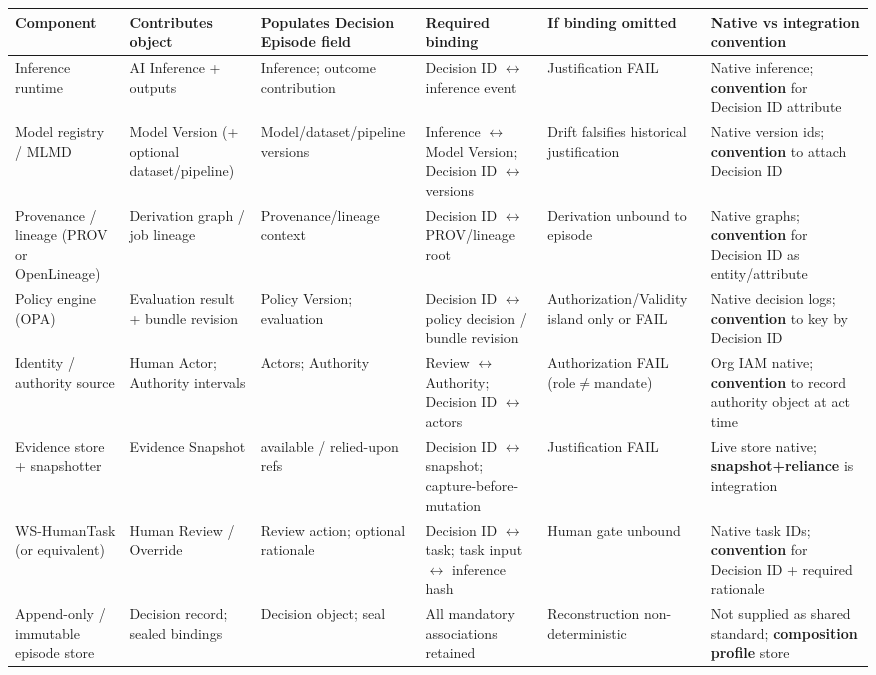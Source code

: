 \documentclass[11pt,a4paper]{article}
\begin{document}
\begin{table}[t]
\centering
\small
\begin{tabularx}{\textwidth}{|X|X|X|X|X|X|}
\hline
 Component & Contributes object & Populates Decision Episode field & Required binding & If binding omitted & Native vs integration convention \\
 \hline
 \hline
 Inference runtime & AI Inference + outputs & Inference; outcome contribution & Decision ID $\leftrightarrow$ inference event & Justification FAIL & Native inference; \textbf{convention} for Decision ID attribute \\
 \hline
 Model registry / MLMD & Model Version (+ optional dataset/pipeline) & Model/dataset/pipeline versions & Inference $\leftrightarrow$ Model Version; Decision ID $\leftrightarrow$ versions & Drift falsifies historical justification & Native version ids; \textbf{convention} to attach Decision ID \\
 \hline
 Provenance / lineage (PROV or OpenLineage) & Derivation graph / job lineage & Provenance/lineage context & Decision ID $\leftrightarrow$ PROV/lineage root & Derivation unbound to episode & Native graphs; \textbf{convention} for Decision ID as entity/attribute \\
 \hline
 Policy engine (OPA) & Evaluation result + bundle revision & Policy Version; evaluation & Decision ID $\leftrightarrow$ policy decision / bundle revision & Authorization/Validity island only or FAIL & Native decision logs; \textbf{convention} to key by Decision ID \\
 \hline
 Identity / authority source & Human Actor; Authority intervals & Actors; Authority & Review $\leftrightarrow$ Authority; Decision ID $\leftrightarrow$ actors & Authorization FAIL (role$\neq$mandate) & Org IAM native; \textbf{convention} to record authority object at act time \\
 \hline
 Evidence store + snapshotter & Evidence Snapshot & available / relied-upon refs & Decision ID $\leftrightarrow$ snapshot; capture-before-mutation & Justification FAIL & Live store native; \textbf{snapshot+reliance} is integration \\
 \hline
 WS-HumanTask (or equivalent) & Human Review / Override & Review action; optional rationale & Decision ID $\leftrightarrow$ task; task input $\leftrightarrow$ inference hash & Human gate unbound & Native task IDs; \textbf{convention} for Decision ID + required rationale \\
 \hline
 Append-only / immutable episode store & Decision record; sealed bindings & Decision object; seal & All mandatory associations retained & Reconstruction non-deterministic & Not supplied as shared standard; \textbf{composition profile} store \\

\end{tabularx}
\end{table}
\end{document}
